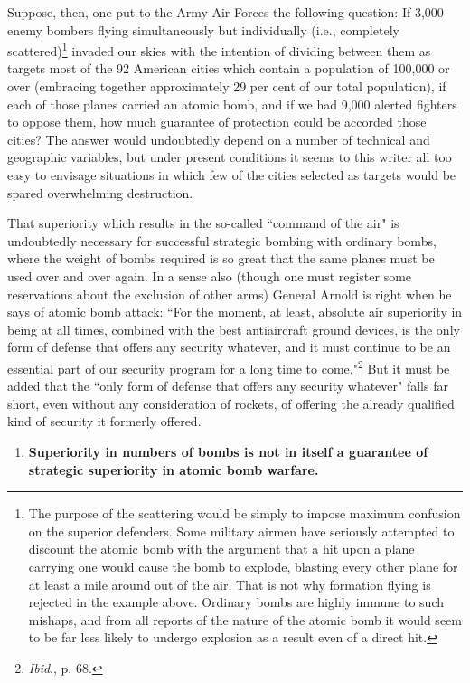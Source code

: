 Suppose, then, one put to the Army Air Forces the following question: If 3,000 enemy bombers flying simultaneously but individually (i.e., completely scattered)\footnote{The purpose of the scattering would be simply to impose maximum confusion on the superior defenders. Some military airmen have seriously attempted to discount the atomic bomb with the argument that a hit upon a plane carrying one would cause the bomb to explode, blasting every other plane for at least a mile around out of the air. That is not why formation flying is rejected in the example above. Ordinary bombs are highly immune to such mishaps, and from all reports of the nature of the atomic bomb it would seem to be far less likely to undergo explosion as a result even of a direct hit.} invaded our skies with the intention of dividing between them as targets most of the 92 American cities which contain a population of 100,000 or over (embracing together approximately 29 per cent of our total population), if each of those planes carried an atomic bomb, and if we had 9,000 alerted fighters to oppose them, how much guarantee of protection could be accorded those cities? The answer would undoubtedly depend on a number of technical and geographic variables, but under present conditions it seems to this writer all too easy to envisage situations in which few of the cities selected as targets would be spared overwhelming destruction.

That superiority which results in the so-called ``command of the air" is undoubtedly necessary for successful strategic bombing with ordinary bombs, where the weight of bombs required is so great that the same planes must be used over and over again. In a sense also (though one must register some reservations about the exclusion of other arms) General Arnold is right when he says of atomic bomb attack: ``For the moment, at least, absolute air superiority in being at all times, combined with the best antiaircraft ground devices, is the only form of defense that offers any security whatever, and it must continue to be an essential part of our security program for a long time to come."\footnote{\textit{Ibid}., p. 68.} But it must be added that the ``only form of defense that offers any security whatever" falls far short, even without any consideration of rockets, of offering the already qualified kind of security it formerly offered.

\begin{enumerate}[resume*]

\item \textbf{Superiority in numbers of bombs is not in itself a guarantee of strategic superiority in atomic bomb warfare.}

\end{enumerate}


